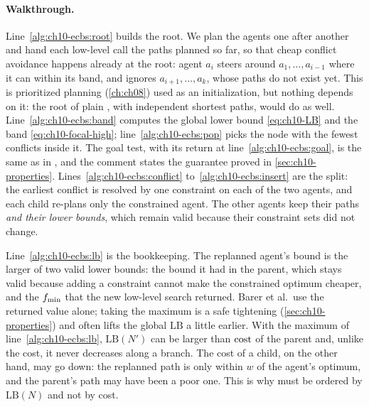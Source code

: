 \paragraph{Walkthrough.}
Line~\ref{alg:ch10-ecbs:root} builds the root. We plan the agents one after
another and hand each low-level call the paths planned so far, so that cheap
conflict avoidance happens already at the root: agent $a_i$ steers around
$a_1, \dots, a_{i-1}$ where it can within its band, and ignores
$a_{i+1}, \dots, a_k$, whose paths do not exist yet. This is prioritized
planning (\cref{ch:ch08}) used as an initialization, but nothing depends on
it: the root of plain \cbs, with independent shortest paths, would do as well.
Line~\ref{alg:ch10-ecbs:band} computes the global lower bound
\cref{eq:ch10-LB} and the band \cref{eq:ch10-focal-high};
line~\ref{alg:ch10-ecbs:pop} picks the node with the fewest conflicts inside
it. The goal test, with its return at line~\ref{alg:ch10-ecbs:goal}, is the same as in \cbs, and the comment states the guarantee proved in \cref{sec:ch10-properties}.
Lines~\ref{alg:ch10-ecbs:conflict} to~\ref{alg:ch10-ecbs:insert} are the
\cbs split: the earliest conflict is resolved by one constraint on each of the
two agents, and each child re-plans only the constrained agent. The other
agents keep their paths \emph{and their lower bounds}, which remain valid
because their constraint sets did not change.

Line~\ref{alg:ch10-ecbs:lb} is the bookkeeping. The replanned agent's bound is
the larger of two valid lower bounds: the bound it had in the parent, which
stays valid because adding a constraint cannot make the constrained optimum
cheaper, and the $f_{\min}$ that the new low-level search returned. Barer
et al.\ use the returned value alone; taking the maximum is a safe tightening
(\cref{sec:ch10-properties}) and often lifts the global $\mathrm{LB}$ a little
earlier. With the maximum of line~\ref{alg:ch10-ecbs:lb}, $\mathrm{LB}(N')$ can be
larger than $\operatorname{cost}$ of the parent and, unlike the cost, it never decreases
along a branch. The cost of a
child, on the other hand, may go down: the replanned path is only within
$w$ of the agent's optimum, and the parent's path may have been a poor one.
This is why \Open must be ordered by $\mathrm{LB}(N)$ and not by cost.

